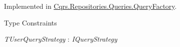 Implemented in \hyperlink{classCqrs_1_1Repositories_1_1Queries_1_1QueryFactory_aefca41f8cab3f333984b782e7c87f3d1}{Cqrs.\+Repositories.\+Queries.\+Query\+Factory}.

\begin{Desc}
\item[Type Constraints]\begin{description}
\item[{\em T\+User\+Query\+Strategy} : {\em I\+Query\+Strategy}]\end{description}
\end{Desc}
